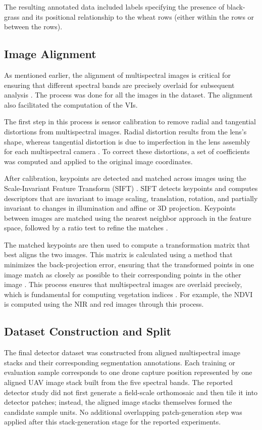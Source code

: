 \documentclass{ieeeaccess}
\begin{document}
The resulting annotated data included labels specifying the presence of black-grass and its positional relationship to the wheat rows (either within the rows or between the rows).

\subsection{Image Alignment}
As mentioned earlier, the alignment of multispectral images is critical for ensuring that different spectral bands are precisely overlaid for subsequent analysis \cite{pettorelli2013}. The process was done for all the images in the dataset. The alignment also facilitated the computation of the VIs. 

The first step in this process is sensor calibration to remove radial and tangential distortions from multispectral images. Radial distortion results from the lens's shape, whereas tangential distortion is due to imperfection in the lens assembly for each multispectral camera \cite{bradski2008learning}. To correct these distortions, a set of coefficients was computed and applied to the original image coordinates.

After calibration, keypoints are detected and matched across images using the Scale-Invariant Feature Transform (SIFT) \cite{lowe2004}. SIFT detects keypoints and computes descriptors that are invariant to image scaling, translation, rotation, and partially invariant to changes in illumination and affine or 3D projection. Keypoints between images are matched using the nearest neighbor approach in the feature space, followed by a ratio test to refine the matches \cite{muja2009}.

The matched keypoints are then used to compute a transformation matrix that best aligns the two images. This matrix is calculated using a method that minimizes the back-projection error, ensuring that the transformed points in one image match as closely as possible to their corresponding points in the other image \cite{hartley2003}. This process ensures that multispectral images are overlaid precisely, which is fundamental for computing vegetation indices \cite{hallosta_multispectral_2024}. For example, the NDVI is computed using the NIR and red images through this process.

\subsection{Dataset Construction and Split}
The final detector dataset was constructed from aligned multispectral image stacks and their corresponding segmentation annotations. Each training or evaluation sample corresponds to one drone capture position represented by one aligned UAV image stack built from the five spectral bands. The reported detector study did not first generate a field-scale orthomosaic and then tile it into detector patches; instead, the aligned image stacks themselves formed the candidate sample units. No additional overlapping patch-generation step was applied after this stack-generation stage for the reported experiments.
\end{document}
